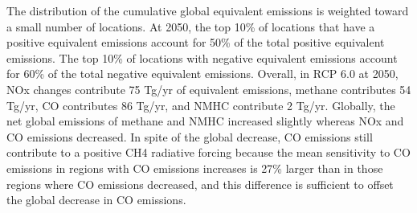 The distribution of the cumulative global equivalent emissions is weighted toward a small number of locations. At 2050, the top 10\% of locations that have a positive equivalent emissions account for 50\% of the total positive equivalent emissions. The top 10\% of locations with negative equivalent emissions account for 60\% of the total negative equivalent emissions. Overall, in RCP 6.0 at 2050, NOx changes contribute 75 Tg/yr of equivalent emissions, methane contributes 54 Tg/yr, CO contributes 86 Tg/yr, and NMHC contribute 2 Tg/yr. Globally, the net global emissions of methane and NMHC increased slightly whereas NOx and CO emissions decreased. In spite of the global decrease, CO emissions still contribute to a positive CH4 radiative forcing because the mean sensitivity to CO emissions in regions with CO emissions increases is 27\% larger than in those regions where CO emissions decreased, and this difference is sufficient to offset the global decrease in CO emissions.

